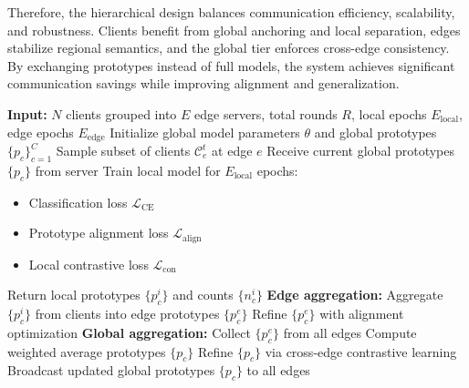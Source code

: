 \documentclass[twoside]{article}
\begin{document}
        Therefore, the hierarchical design balances communication efficiency, scalability, and robustness. Clients benefit from global anchoring and local separation, edges stabilize regional semantics, and the global tier enforces cross-edge consistency. By exchanging prototypes instead of full models, the system achieves significant communication savings while improving alignment and generalization.
    \begin{algorithm}
    \caption{Hierarchical Prototype-based Federated Learning with Contrastive Alignment}
    \label{alg:ours}
    \begin{algorithmic}[1]
    \STATE \textbf{Input:} $N$ clients grouped into $E$ edge servers, total rounds $R$, local epochs $E_{\text{local}}$, edge epochs $E_{\text{edge}}$
    \STATE Initialize global model parameters $\theta$ and global prototypes $\{p_c\}_{c=1}^C$
                \STATE Sample subset of clients $\mathcal{C}_e^t$ at edge $e$
                    \STATE Receive current global prototypes $\{p_c\}$ from server
                    \STATE Train local model for $E_{\text{local}}$ epochs:
                    \begin{itemize}
                        \item Classification loss $\mathcal{L}_{\text{CE}}$
                        \item Prototype alignment loss $\mathcal{L}_{\text{align}}$
                        \item Local contrastive loss $\mathcal{L}_{\text{con}}$
                    \end{itemize}
                    \STATE Return local prototypes $\{p_c^i\}$ and counts $\{n_c^i\}$
                \ENDFOR
                \STATE \textbf{Edge aggregation:} Aggregate $\{p_c^i\}$ from clients into edge prototypes $\{p_c^e\}$
                \STATE Refine $\{p_c^e\}$ with alignment optimization
            \ENDFOR
        \ENDFOR
        \STATE \textbf{Global aggregation:} Collect $\{p_c^e\}$ from all edges
        \STATE Compute weighted average prototypes $\{p_c\}$
        \STATE Refine $\{p_c\}$ via cross-edge contrastive learning
        \STATE Broadcast updated global prototypes $\{p_c\}$ to all edges
    \ENDFOR
    \end{algorithmic}
    \end{algorithm}
    
\end{document}
